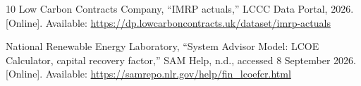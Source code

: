 \documentclass[lettersize,journal]{IEEEtran}
\begin{document}
\begin{thebibliography}{10}
\BIBentryALTinterwordspacing
{Low Carbon Contracts Company}, ``{{IMRP} actuals},'' LCCC Data Portal, 2026.
  [Online]. Available:
  \url{https://dp.lowcarboncontracts.uk/dataset/imrp-actuals}
\BIBentrySTDinterwordspacing

\BIBentryALTinterwordspacing
{National Renewable Energy Laboratory}, ``{System Advisor Model: LCOE
  Calculator, capital recovery factor},'' SAM Help, n.d., accessed 8 September
  2026. [Online]. Available:
  \url{https://samrepo.nlr.gov/help/fin_lcoefcr.html}
\BIBentrySTDinterwordspacing

\end{thebibliography}
\end{document}
